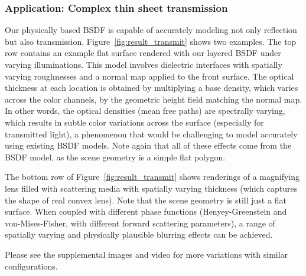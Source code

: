 \subsubsection{Application: Complex thin sheet transmission}
%
Our physically based BSDF is capable of accurately modeling not only reflection but also transmission.
Figure~\ref{fig:result_transmit} shows two examples.
The top row contains an example flat surface rendered with our layered BSDF under varying illuminations.
This model involves dielectric interfaces with spatially varying roughnesses and a normal map applied to the front surface.
The optical thickness at each location is obtained by multiplying a base density, which varies across the color channels, by the geometric height field matching the normal map.
In other words, the optical densities (mean free paths) are spectrally varying, which results in subtle color variations across the surface (especially for transmitted light), a phenomenon that would be challenging to model accurately using existing BSDF models. Note again that all of these effects come from the BSDF model, as the scene geometry is a simple flat polygon.

The bottom row of Figure~\ref{fig:result_transmit} shows renderings of a magnifying lens filled with scattering media with spatially varying thickness (which captures the shape of real convex lens). Note that the scene geometry is still just a flat surface.
When coupled with different phase functions (Henyey-Greenstein and von-Mises-Fisher, with different forward scattering parameters), a range of spatially varying and physically plausible blurring effects can be achieved.

Please see the supplemental images and video for more variations with similar configurations.

